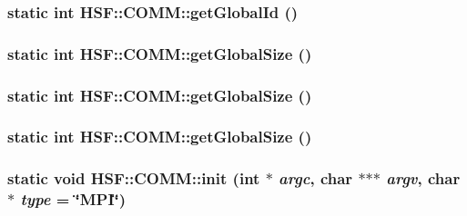 \label{classHSF_1_1COMM_a4c2a5c578e26fb2e53f8fad13f9e79ba}
\hypertarget{classHSF_1_1COMM_a4c2a5c578e26fb2e53f8fad13f9e79ba}{
\subsubsection[{getGlobalId}]{\setlength{\rightskip}{0pt plus 5cm}static int HSF::COMM::getGlobalId ()}}
\label{classHSF_1_1COMM_a4c2a5c578e26fb2e53f8fad13f9e79ba}
\hypertarget{classHSF_1_1COMM_a454b84b21cd889f986a94fe0d51d43ee}{
\subsubsection[{getGlobalSize}]{\setlength{\rightskip}{0pt plus 5cm}static int HSF::COMM::getGlobalSize ()}}
\label{classHSF_1_1COMM_a454b84b21cd889f986a94fe0d51d43ee}
\hypertarget{classHSF_1_1COMM_a454b84b21cd889f986a94fe0d51d43ee}{
\subsubsection[{getGlobalSize}]{\setlength{\rightskip}{0pt plus 5cm}static int HSF::COMM::getGlobalSize ()}}
\label{classHSF_1_1COMM_a454b84b21cd889f986a94fe0d51d43ee}
\hypertarget{classHSF_1_1COMM_a454b84b21cd889f986a94fe0d51d43ee}{
\subsubsection[{getGlobalSize}]{\setlength{\rightskip}{0pt plus 5cm}static int HSF::COMM::getGlobalSize ()}}
\label{classHSF_1_1COMM_a454b84b21cd889f986a94fe0d51d43ee}
\hypertarget{classHSF_1_1COMM_a4e1c8c801a57bb3f57e78e89ecbe98a4}{
\subsubsection[{init}]{\setlength{\rightskip}{0pt plus 5cm}static void HSF::COMM::init (int $\ast$ {\em argc}, \/  char $\ast$$\ast$$\ast$ {\em argv}, \/  char $\ast$ {\em type} = {\ttfamily \char`\"{}MPI\char`\"{}})}}
